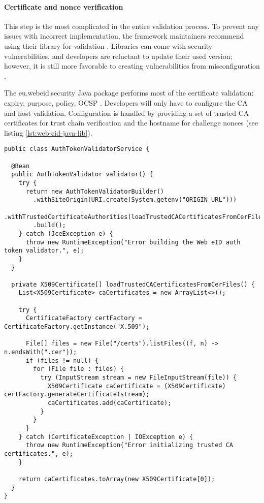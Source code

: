 \paragraph{Certificate and nonce verification}

This step is the most complicated in the entire validation process. To prevent any issues with incorrect implementation, the framework maintainers recommend using their library for validation \cite{ria-webeid-source-web-eid-authtoken-validation-java-readme}. Libraries can come with security vulnerabilities, and developers are reluctant to update their used version; however, it is still more favorable to creating vulnerabilities from misconfiguration \cite{9240619}.

The eu.webeid.security Java package performs most of the certificate validation: expiry, purpose, policy, OCSP \cite{ria-webeid-source-web-eid-authtoken-validation-java-readme}. Developers will only have to configure the CA and host validation. Configuration is handled by providing a set of trusted CA certificates for trust chain verification and the hostname for challenge nonces (see listing \ref{lst:web-eid-java-lib}).


\begin{lstlisting}[caption={Web eID Login Endpoint}, label={lst:web-eid-java-lib}]
public class AuthTokenValidatorService {

  @Bean
  public AuthTokenValidator validator() {
    try {
      return new AuthTokenValidatorBuilder()
        .withSiteOrigin(URI.create(System.getenv("ORIGIN_URL")))
        .withTrustedCertificateAuthorities(loadTrustedCACertificatesFromCerFiles())
        .build();
    } catch (JceException e) {
      throw new RuntimeException("Error building the Web eID auth token validator.", e);
    }
  }

  private X509Certificate[] loadTrustedCACertificatesFromCerFiles() {
    List<X509Certificate> caCertificates = new ArrayList<>();

    try {
      CertificateFactory certFactory = CertificateFactory.getInstance("X.509");

      File[] files = new File("/certs").listFiles((f, n) -> n.endsWith(".cer"));
      if (files != null) {
        for (File file : files) {
          try (InputStream stream = new FileInputStream(file)) {
            X509Certificate caCertificate = (X509Certificate) certFactory.generateCertificate(stream);
            caCertificates.add(caCertificate);
          }
        }
      }
    } catch (CertificateException | IOException e) {
      throw new RuntimeException("Error initializing trusted CA certificates.", e);
    }

    return caCertificates.toArray(new X509Certificate[0]);
  }
}
\end{lstlisting}

